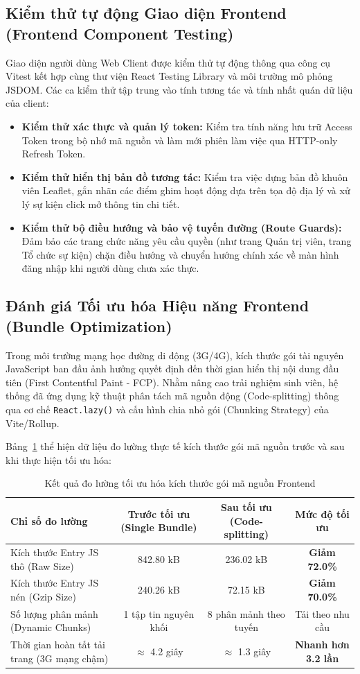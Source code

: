 \subsection{Kiểm thử tự động Giao diện Frontend (Frontend Component Testing)}
Giao diện người dùng Web Client được kiểm thử tự động thông qua công cụ Vitest kết hợp cùng thư viện React Testing Library và môi trường mô phỏng JSDOM. Các ca kiểm thử tập trung vào tính tương tác và tính nhất quán dữ liệu của client:
\begin{itemize}
    \item \textbf{Kiểm thử xác thực và quản lý token:} Kiểm tra tính năng lưu trữ Access Token trong bộ nhớ mã nguồn và làm mới phiên làm việc qua HTTP-only Refresh Token.
    \item \textbf{Kiểm thử hiển thị bản đồ tương tác:} Kiểm tra việc dựng bản đồ khuôn viên Leaflet, gắn nhãn các điểm ghim hoạt động dựa trên tọa độ địa lý và xử lý sự kiện click mở thông tin chi tiết.
    \item \textbf{Kiểm thử bộ điều hướng và bảo vệ tuyến đường (Route Guards):} Đảm bảo các trang chức năng yêu cầu quyền (như trang Quản trị viên, trang Tổ chức sự kiện) chặn điều hướng và chuyển hướng chính xác về màn hình đăng nhập khi người dùng chưa xác thực.
\end{itemize}

\subsection{Đánh giá Tối ưu hóa Hiệu năng Frontend (Bundle Optimization)}
Trong môi trường mạng học đường di động (3G/4G), kích thước gói tài nguyên JavaScript ban đầu ảnh hưởng quyết định đến thời gian hiển thị nội dung đầu tiên (First Contentful Paint - FCP). Nhằm nâng cao trải nghiệm sinh viên, hệ thống đã ứng dụng kỹ thuật phân tách mã nguồn động (Code-splitting) thông qua cơ chế \texttt{React.lazy()} và cấu hình chia nhỏ gói (Chunking Strategy) của Vite/Rollup. 

Bảng~\ref{tab:bundle_optimization} thể hiện dữ liệu đo lường thực tế kích thước gói mã nguồn trước và sau khi thực hiện tối ưu hóa:

\begin{table}[H]
\centering
\small
\begin{tabular}{|l|c|c|c|}
\hline
\textbf{Chỉ số đo lường} & \textbf{Trước tối ưu (Single Bundle)} & \textbf{Sau tối ưu (Code-splitting)} & \textbf{Mức độ tối ưu} \\ \hline
Kích thước Entry JS thô (Raw Size) & 842.80 kB & 236.02 kB & \textbf{Giảm 72.0\%} \\ \hline
Kích thước Entry JS nén (Gzip Size) & 240.26 kB & 72.15 kB & \textbf{Giảm 70.0\%} \\ \hline
Số lượng phân mảnh (Dynamic Chunks) & 1 tập tin nguyên khối & 8 phân mảnh theo tuyến & Tải theo nhu cầu \\ \hline
Thời gian hoàn tất tải trang (3G mạng chậm) & $\approx$ 4.2 giây & $\approx$ 1.3 giây & \textbf{Nhanh hơn 3.2 lần} \\ \hline
\end{tabular}
\caption{Kết quả đo lường tối ưu hóa kích thước gói mã nguồn Frontend}
\label{tab:bundle_optimization}
\end{table}

